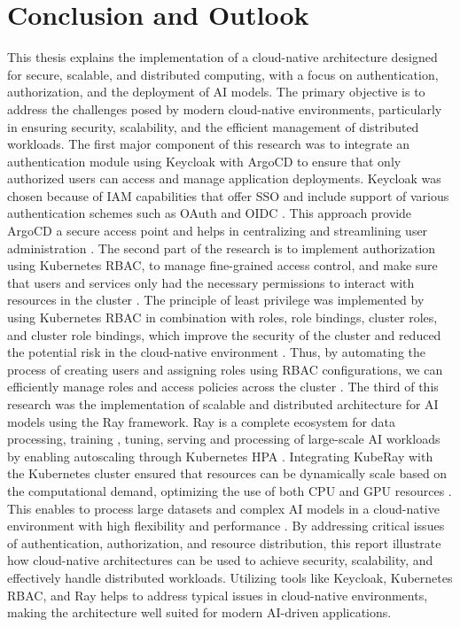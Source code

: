 \chapter{Conclusion and Outlook}

This thesis explains the implementation of a cloud-native architecture designed for secure, scalable, and distributed computing, with a focus on authentication, authorization, and the deployment of AI models. The primary objective is to address the challenges posed by modern cloud-native environments, particularly in ensuring security, scalability, and the efficient management of distributed workloads. The first major component of this research was to integrate an authentication module using Keycloak with ArgoCD to ensure that only authorized users can access and manage application deployments. Keycloak was chosen because of IAM capabilities that offer SSO and include support of various authentication schemes such as OAuth and OIDC \cite{keycloak_doc}. This approach provide ArgoCD a secure access point and helps in centralizing and streamlining user administration \cite{keycloak_doc}. The second part of the research is to implement authorization using Kubernetes RBAC, to manage fine-grained access control, and make sure that users and services only had the necessary permissions to interact with resources in the cluster \cite{Kubernetes_doc}. The principle of least privilege was implemented by using Kubernetes RBAC in combination with roles, role bindings, cluster roles, and cluster role bindings, which improve the security of the cluster and reduced the potential risk in the cloud-native environment \cite{Kubernetes_doc}. Thus, by automating the process of creating users and assigning roles using RBAC configurations, we can efficiently manage roles and access policies across the cluster \cite{Kubernetes_doc}. The third of this research was the implementation of scalable and distributed architecture for AI models using the Ray framework. Ray is a complete ecosystem for data processing, training , tuning, serving and processing of large-scale AI workloads by enabling autoscaling through Kubernetes HPA \cite{ray_doc}. Integrating KubeRay with the Kubernetes cluster ensured that resources can be dynamically scale based on the computational demand, optimizing the use of both CPU and GPU resources \cite{ray_doc}. This enables to process large datasets and complex AI models in a cloud-native environment with high flexibility and performance \cite{ray_doc}. By addressing critical issues of authentication, authorization, and resource distribution, this report illustrate how cloud-native architectures can be used to achieve security, scalability, and effectively handle distributed workloads. Utilizing tools like Keycloak, Kubernetes RBAC, and Ray helps to address typical issues in cloud-native environments, making the architecture well suited for modern AI-driven applications.

